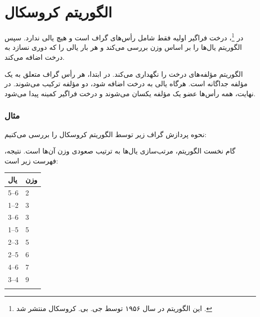 \section{الگوریتم کروسکال}


در \footnote{این الگوریتم در سال ۱۹۵۶ توسط جی. بی. کروسکال منتشر شد \cite{kru56}.}، درخت فراگیر اولیه فقط شامل رأس‌های گراف است و هیچ یالی ندارد.
سپس الگوریتم یال‌ها را بر اساس وزن بررسی می‌کند و هر بار یالی را که دوری نسازد به درخت اضافه می‌کند.

الگوریتم مؤلفه‌های درخت را نگهداری می‌کند.
در ابتدا، هر رأس گراف متعلق به یک مؤلفه جداگانه است.
هرگاه یالی به درخت اضافه شود، دو مؤلفه ترکیب می‌شوند.
در نهایت، همه رأس‌ها عضو یک مؤلفه یکسان می‌شوند و درخت فراگیر کمینه پیدا می‌شود.

\subsubsection{مثال}

\begin{samepage}
نحوه پردازش گراف زیر توسط الگوریتم کروسکال را بررسی می‌کنیم:
\begin{center}
\end{center}
\end{samepage}

\begin{samepage}
گام نخست الگوریتم، مرتب‌سازی یال‌ها به ترتیب صعودی وزن آن‌ها است.
نتیجه، فهرست زیر است:

\begin{tabular}{ll}
\\
یال & وزن \\
\hline
5--6 & 2 \\
1--2 & 3 \\
3--6 & 3 \\
1--5 & 5 \\
2--3 & 5 \\
2--5 & 6 \\
4--6 & 7 \\
3--4 & 9 \\
\\
\end{tabular}
\end{samepage}

